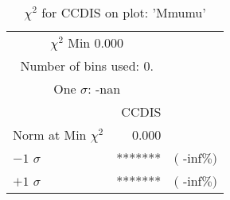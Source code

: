  \begin{table}[h!]\centering
 {\small{
 \begin{tabular}{||l||r||r||}
 \hline
 \hline
\multicolumn{2}{||c||}{$\chi^{2}$ Min   0.000} & \\
 \multicolumn{2}{||c||}{Number of bins used:   0.} & \\
\multicolumn{2}{||c||}{One $\sigma$:     -nan} & \\
 \hline
 \hline
    & CCDIS & \\
Norm at Min $\chi^{2}$  &   0.000 & \\
$-1$ $\sigma$ & *******  &  $($ -inf$\%)$  \\
$+1$ $\sigma$ & *******  &  $($ -inf$\%)$  \\
 \hline
 \hline
 \end{tabular}
 \caption{$\chi^{2}$ for CCDIS on plot: 'Mmumu'}
 \label{tab-chiccdis}
 }}
 \end{table}
 \endinput
